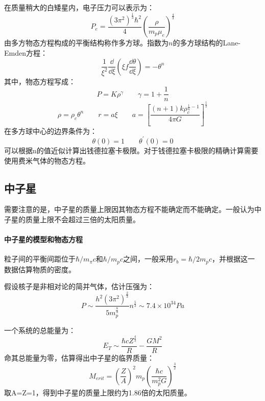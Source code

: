 在质量稍大的白矮星内，电子压力可以表示为：
\begin{equation}
	P_{e}=\frac{\left(3\pi^2\right)^{\frac{1}{3}}\hbar^2}{4}\left(\frac{\rho}{m_{p}\mu_{e}}\right)^{\frac{4}{3}}
\end{equation}
由多方物态方程构成的平衡结构称作多方球。指数为$n$的多方球结构的Lane-Emden方程：
\begin{equation}
	\frac{1}{\xi^2}\frac{\dd }{\dd \xi}\left(\xi f\frac{\dd \theta}{\dd \xi}\right)=-\theta^n
\end{equation}
其中，物态方程写成：
\begin{equation}
	P=K\rho^\gamma\qquad \gamma=1+\frac{1}{n}
\end{equation}
\begin{equation}
	\rho=\rho_{c}\theta^n\qquad r=a\xi\qquad a=\left[\frac{(n+1)k\rho_{c}^{\frac{1}{n}-1}}{4\pi G}\right]^{\frac{1}{2}}
\end{equation}
在多方球中心的边界条件为：
\begin{equation}
	\theta(0)=1\qquad \theta^\prime(0)=0
\end{equation}
可以根据n的值近似计算出钱德拉塞卡极限。对于钱德拉塞卡极限的精确计算需要使用费米气体的物态方程。
\subsection{中子星}
需要注意的是，中子星的质量上限因其物态方程不能确定而不能确定。一般认为中子星的质量上限不会超过三倍的太阳质量。
\paragraph{中子星的模型和物态方程}
粒子间的平衡间距位于$\hbar/m_{\pi}c$和$\hbar/m_{p}c$之间，一般采用$r_{b}=\hbar/2m_{p}c$，并根据这一数据估算物质的密度。

假设核子是非相对论的简并气体，估计压强为：
\begin{equation}
	P\sim\frac{h^2(3\pi^2)^{\frac{2}{3}}}{5m_{p}^{\frac{8}{3}}}n^{\frac{5}{3}}\sim 7.4\times 10^{34}Pa
\end{equation}

一个系统的总能量为：
\begin{equation}
	E_{T}\sim\frac{\hbar c Z^{\frac{4}{3}}}{R}-\frac{GM^2}{R}
\end{equation}
命其总能量为零，估算得出中子星的临界质量：
\begin{equation}
	M_{erit}=\left(\frac{Z}{A}\right)^2m_{p}\left(\frac{\hbar c}{m_{p}^2G}\right)^{\frac{3}{2}}
\end{equation}
取A=Z=1，得到中子星的质量上限约为1.86倍的太阳质量。

